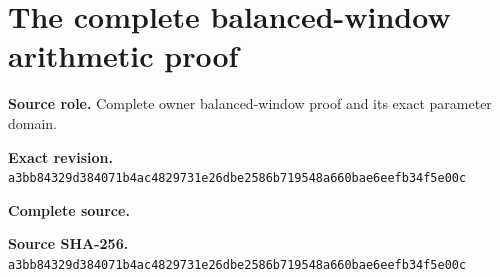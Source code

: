\begingroup
\sloppy
\small
\section{The complete balanced-window arithmetic proof}
\noindent\textbf{Source role.} Complete owner balanced-window proof and its exact parameter domain.\par
\noindent\textbf{Exact revision.} \nolinkurl{a3bb84329d384071b4ac4829731e26dbe2586b719548a660bae6eefb34f5e00c}\par
\noindent\textbf{Complete source.} \par
\noindent\textbf{Source SHA-256.} \nolinkurl{a3bb84329d384071b4ac4829731e26dbe2586b719548a660bae6eefb34f5e00c}\par\medskip

\endgroup
